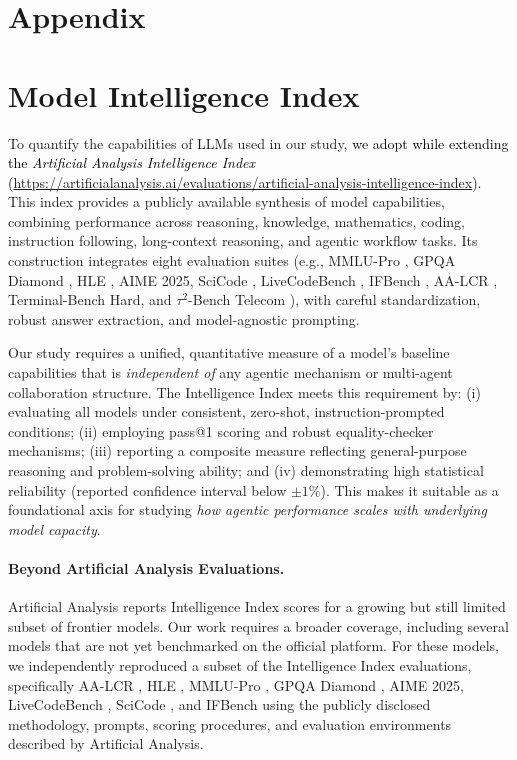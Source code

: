 \newpage

\appendix

\section*{\LARGE Appendix}

\section{Model Intelligence Index}
\label{sec:appendix-intelligence-index}

To quantify the capabilities of LLMs used in our study, \textcolor{black}{we adopt while extending the \textit{Artificial Analysis Intelligence Index} (\url{https://artificialanalysis.ai/evaluations/artificial-analysis-intelligence-index}).} This index provides a publicly available synthesis of model capabilities, combining performance across reasoning, knowledge, mathematics, coding, instruction following, long-context reasoning, and agentic workflow tasks. Its construction integrates eight evaluation suites (e.g., MMLU-Pro \citep{wang2024mmlu}, GPQA Diamond \citep{rein2024gpqa}, HLE \citep{phan2025humanity}, AIME 2025, SciCode \citep{tian2024scicode}, LiveCodeBench \citep{jain2025livecodebench}, IFBench \citep{pyatkin2025generalizing}, AA-LCR \citep{artificialanalysis2025lcr}, Terminal-Bench Hard, and $\tau^2$-Bench Telecom \citep{barres2025t2bench}), with careful standardization, robust answer extraction, and model-agnostic prompting. 

Our study requires a unified, quantitative measure of a model’s baseline capabilities that is \emph{independent of} any agentic mechanism or multi-agent collaboration structure. The Intelligence Index meets this requirement by:  
(i) evaluating all models under consistent, zero-shot, instruction-prompted conditions;  
(ii) employing pass@1 scoring and robust equality-checker mechanisms;  
(iii) reporting a composite measure reflecting general-purpose reasoning and problem-solving ability; and  
(iv) demonstrating high statistical reliability (reported confidence interval below $\pm 1\%$).  
This makes it suitable as a foundational axis for studying \textit{how agentic performance scales with underlying model capacity}.

\paragraph{Beyond Artificial Analysis Evaluations.}  
Artificial Analysis reports Intelligence Index scores for a growing but still limited subset of frontier models. Our work requires a broader coverage, including several models that are not yet benchmarked on the official platform. For these models, we independently reproduced a subset of the Intelligence Index evaluations, specifically AA-LCR \citep{artificialanalysis2025lcr}, HLE \citep{phan2025humanity}, MMLU-Pro \citep{wang2024mmlu}, GPQA Diamond \citep{rein2024gpqa}, AIME 2025, LiveCodeBench \citep{jain2025livecodebench}, SciCode \citep{tian2024scicode}, and IFBench \citep{pyatkin2025generalizing} using the publicly disclosed methodology, prompts, scoring procedures, and evaluation environments described by Artificial Analysis. 

